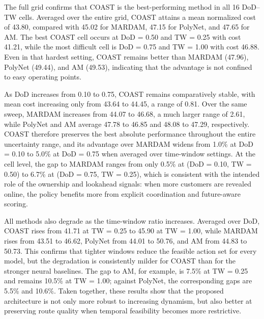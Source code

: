 \documentclass[letterpaper]{article}
\begin{document}
The full grid confirms that COAST is the best-performing method in all 16 DoD--TW cells. Averaged over the entire grid, COAST attains a mean normalized cost of 43.80, compared with 45.02 for MARDAM, 47.15 for PolyNet, and 47.65 for AM. The best COAST cell occurs at DoD = 0.50 and TW = 0.25 with cost 41.21, while the most difficult cell is DoD = 0.75 and TW = 1.00 with cost 46.88. Even in that hardest setting, COAST remains better than MARDAM (47.96), PolyNet (49.44), and AM (49.53), indicating that the advantage is not confined to easy operating points.

As DoD increases from 0.10 to 0.75, COAST remains comparatively stable, with mean cost increasing only from 43.64 to 44.45, a range of 0.81. Over the same sweep, MARDAM increases from 44.07 to 46.68, a much larger range of 2.61, while PolyNet and AM average 47.78 to 46.85 and 48.08 to 47.29, respectively. COAST therefore preserves the best absolute performance throughout the entire uncertainty range, and its advantage over MARDAM widens from 1.0\% at DoD = 0.10 to 5.0\% at DoD = 0.75 when averaged over time-window settings. At the cell level, the gap to MARDAM ranges from only 0.5\% at (DoD = 0.10, TW = 0.50) to 6.7\% at (DoD = 0.75, TW = 0.25), which is consistent with the intended role of the ownership and lookahead signals: when more customers are revealed online, the policy benefits more from explicit coordination and future-aware scoring.

All methods also degrade as the time-window ratio increases. Averaged over DoD, COAST rises from 41.71 at TW = 0.25 to 45.90 at TW = 1.00, while MARDAM rises from 43.51 to 46.62, PolyNet from 44.01 to 50.76, and AM from 44.83 to 50.73. This confirms that tighter windows reduce the feasible action set for every model, but the degradation is consistently milder for COAST than for the stronger neural baselines. The gap to AM, for example, is 7.5\% at TW = 0.25 and remains 10.5\% at TW = 1.00; against PolyNet, the corresponding gaps are 5.5\% and 10.6\%. Taken together, these results show that the proposed architecture is not only more robust to increasing dynamism, but also better at preserving route quality when temporal feasibility becomes more restrictive.
\end{document}
